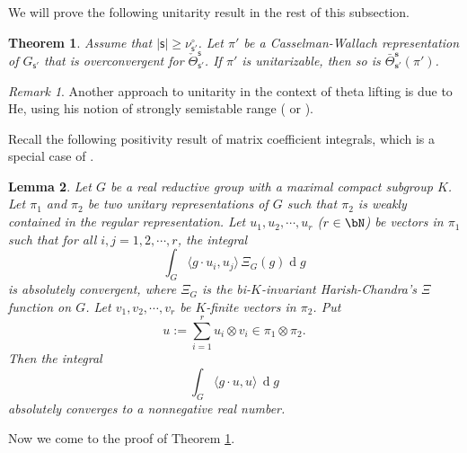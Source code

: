 \documentclass[12pt,a4paper]{amsart}
\def\abs#1{\left|{#1}\right|}
\newcommand{\od}{\operatorname{d}}
\newcommand{\la}{\langle}
\newcommand{\ra}{\rangle}
\numberwithin{equation}{section}
\newtheorem{thm}{Theorem}[section]
\newtheorem{lem}[thm]{Lemma}
\theoremstyle{remark}
\newtheorem*{remark}{Remark}
\def\Thetab{\bar{\Theta}}
\begin{document}
We will prove the  following unitarity result in  the rest of this subsection.
\begin{thm}\label{positivity000}
Assume that $\abs{\mathsf s}\geq \nu^\circ_{\mathsf s'}$. Let $\pi'$ be a Casselman-Wallach representation of $G_{\mathsf s'}$ that is overconvergent  for $\check \Theta_{\mathsf s'}^{\mathsf s}$. If $\pi'$ is unitarizable, then so is $\Thetab_{\mathbf s'}^{\mathbf s}(\pi')$.
\end{thm}

\begin{remark} Another approach to unitarity in the context of theta lifting is due to He, using his notion of strongly semistable range (\cite[Chapter 5]{He} or \cite{He2}).
\end{remark}


Recall the following positivity result of matrix coefficient integrals, which is a special case of \cite[Theorem A. 5]{HLS}.

\begin{lem}\label{positivity}
Let $G$ be a real reductive group with a maximal compact subgroup $K$. Let $\pi_1$ and $\pi_2$ be two unitary representations of $G$ such that $\pi_2$ is weakly
contained in the regular representation. Let $u_1, u_2, \cdots, u_r$ ($r\in \bN$) be vectors in $\pi_1$ such that for all $i,j=1,2, \cdots, r$,
the integral
\[
  \int_G \la g\cdot u_i, u_j\ra\,\Xi_G (g) \od\!g %
\]
is absolutely convergent, where  $\Xi_G$ is the bi-$K$-invariant Harish-Chandra's $\Xi$ function on $G$.   Let $v_1,v_2,\cdots, v_r$ be  $K$-finite vectors in $\pi_2$.
Put
\[
u:=\sum_{i=1}^r u_i\otimes v_i\in \pi_1\otimes \pi_2.
\]
Then the integral
\[%
\int_G \la g \cdot u,u \rangle\,\od\! g
\]%
absolutely converges to a nonnegative real number.
\end{lem}


Now we come to the proof of Theorem \ref{positivity000}.


\end{document}
